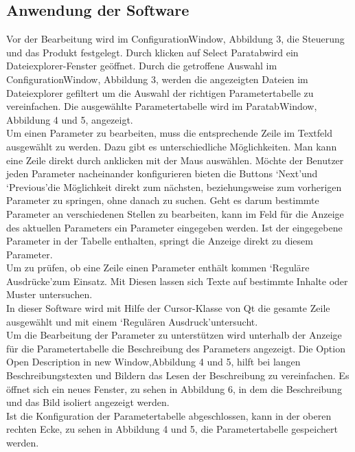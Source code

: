 \subsection{Anwendung der Software}
Vor der Bearbeitung wird im ConfigurationWindow, Abbildung 3, die Steuerung und das Produkt festgelegt. Durch klicken auf \glqq Select Paratab\grqq\space wird ein Dateiexplorer-Fenster geöffnet. Durch die getroffene Auswahl im ConfigurationWindow, Abbildung 3, werden die angezeigten Dateien im Dateiexplorer gefiltert um die Auswahl der richtigen Parametertabelle zu vereinfachen. Die ausgewählte Parametertabelle wird im ParatabWindow, Abbildung 4 und 5, angezeigt.\\
Um einen Parameter zu bearbeiten, muss die entsprechende Zeile im Textfeld ausgewählt zu werden. Dazu gibt es unterschiedliche Möglichkeiten. Man kann eine Zeile direkt durch anklicken mit der Maus auswählen. Möchte der Benutzer jeden Parameter nacheinander konfigurieren bieten die Buttons \lq Next\rq\space und \lq Previous\rq\space die Möglichkeit direkt zum nächsten, beziehungsweise zum vorherigen Parameter zu springen, ohne danach zu suchen. Geht es darum bestimmte Parameter an verschiedenen Stellen zu bearbeiten, kann im Feld für die Anzeige des aktuellen Parameters ein Parameter eingegeben werden. Ist der eingegebene Parameter in der Tabelle enthalten, springt die Anzeige direkt zu diesem Parameter.\\
Um zu prüfen, ob eine Zeile einen Parameter enthält kommen \lq Reguläre Ausdrücke\rq\space zum Einsatz. Mit Diesen lassen sich Texte auf bestimmte Inhalte oder Muster untersuchen. \\
In dieser Software wird mit Hilfe der Cursor-Klasse von Qt die gesamte Zeile ausgewählt und mit einem \lq Regulären Ausdruck\rq\space untersucht. \\
Um die Bearbeitung der Parameter zu unterstützen wird unterhalb der Anzeige für die Parametertabelle die Beschreibung des Parameters angezeigt. Die Option \glqq Open Description in new Window\grqq ,\space Abbildung 4 und 5, hilft bei langen Beschreibungstexten und Bildern das Lesen der Beschreibung zu vereinfachen. Es öffnet sich ein neues Fenster, zu sehen in Abbildung 6, in dem die Beschreibung und das Bild isoliert angezeigt werden.\\
Ist die Konfiguration der Parametertabelle abgeschlossen, kann in der oberen rechten Ecke, zu sehen in Abbildung 4 und 5, die Parametertabelle gespeichert werden. 